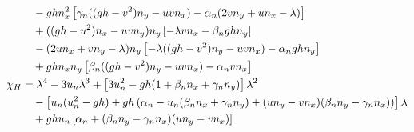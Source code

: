 \documentclass[11pt, a4paper, oneside]{report}
\begin{document}
\begin{appendices}
\begin{align}
    & \quad - gh n_x^2 \left[ \gamma_n ((gh - v^2) n_y - uv n_x) - \alpha_n (2v n_y + u n_x - \lambda) \right] \notag \\
    & \quad + ((gh - u^2) n_x - uv n_y) n_y \left[ -\lambda v n_x - \beta_n gh n_y \right] \notag \\
    & \quad - (2u n_x + v n_y - \lambda) n_y \left[ -\lambda((gh - v^2) n_y - uv n_x) - \alpha_n gh n_y \right] \notag \\
    & \quad + gh n_x n_y \left[ \beta_n ((gh - v^2) n_y - uv n_x) - \alpha_n v n_x \right] \notag \\
    \chi_H & = \lambda^4 - 3u_n \lambda^3 + \left[ 3 u_n^2 -gh(1 + \beta_n n_x + \gamma_n n_y) \right] \lambda^2 \notag \\
    & \quad - \left[ u_n(u_n^2 - gh) + gh \left( \alpha_n - u_n(\beta_n n_x + \gamma_n n_y) + (u n_y - v n_x)(\beta_n n_y - \gamma_n n_x) \right) \right] \lambda \notag \\
    & \quad + gh u_n \left[ \alpha_n + (\beta_n n_y - \gamma_n n_x)(u n_y - v n_x) \right] \label{eq:polynome_exner}
\end{align}

\end{appendices}
\end{document}
